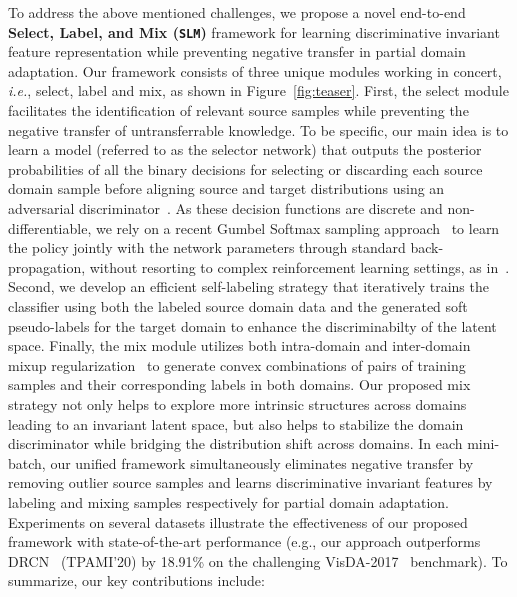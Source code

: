 \documentclass[10pt,twocolumn,letterpaper]{article}
\def\ours{\texttt{\textbf{SLM}}\xspace}
\begin{document}
To address the above mentioned challenges, we propose a novel end-to-end \textbf{Select, Label, and Mix (\ours)} framework for learning discriminative invariant feature representation while preventing negative transfer in partial domain adaptation. Our framework consists of three unique modules working in concert, \textit{i.e.}, select, label and mix, as shown in Figure~\ref{fig:teaser}. First, the select module facilitates the identification of relevant source samples while preventing the negative transfer of untransferrable knowledge. To be specific, our main idea is to learn a model (referred to as the selector network) that outputs the posterior probabilities of all the binary decisions for selecting or discarding each source domain sample before aligning source and target distributions using an adversarial discriminator~\cite{ganin2016domain,long2018conditional}. As these decision functions are discrete and non-differentiable, we rely on a recent Gumbel Softmax sampling approach~\cite{jang2016categorical} to learn the policy jointly with the network parameters through standard back-propagation, without resorting to complex reinforcement learning settings, as in~\cite{chen2019domain, chen2020selective}. Second, we develop an efficient self-labeling strategy that iteratively trains the classifier using both the labeled source domain data and the generated soft pseudo-labels for the target domain to enhance the discriminabilty of the latent space. Finally, the mix module utilizes both intra-domain and inter-domain mixup regularization~\cite{zhang2017mixup} to generate convex combinations of pairs of training samples and their corresponding labels in both domains. Our proposed mix strategy not only helps to explore more intrinsic structures across domains leading to an invariant latent space, but also helps to stabilize the domain discriminator while bridging the distribution shift across domains. In each mini-batch, our unified framework simultaneously eliminates negative transfer by removing outlier source samples and learns discriminative invariant features by labeling and mixing samples respectively for partial domain adaptation. 
Experiments on several datasets illustrate the effectiveness of our proposed framework with state-of-the-art performance (e.g., our approach outperforms DRCN~\cite{li2020deep} (TPAMI'20) by 18.91\% on the challenging VisDA-2017~\cite{peng2017visda} benchmark).
To summarize, our key contributions include:
\end{document}
